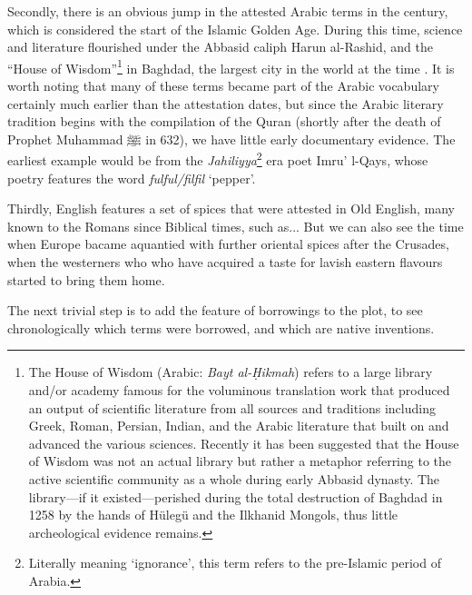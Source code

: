 Secondly, there is an obvious jump in the attested Arabic terms in the  century, which is considered the start of the Islamic Golden Age. During this time, science and literature flourished under the Abbasid caliph Harun al-Rashid, and the ``House of Wisdom''\footnote{The House of Wisdom (Arabic: \textit{Bayt al-Ḥikmah}) refers to a large library and/or academy famous for the voluminous translation work that produced an output of scientific literature from all sources and traditions including Greek, Roman, Persian, Indian, and the Arabic literature that built on and advanced the various sciences. Recently it has been suggested that the House of Wisdom was not an actual library but rather a metaphor referring to the active scientific community as a whole during early Abbasid dynasty. The library---if it existed---perished during the total destruction of Baghdad in 1258 by the hands of Hülegü and the Ilkhanid Mongols, thus little archeological evidence remains.} in Baghdad, the largest city in the world at the time \autocite{gutas_greek_1998}. It is worth noting that many of these terms became part of the Arabic vocabulary certainly much earlier than the attestation dates, but since the Arabic literary tradition begins with the compilation of the Quran (shortly after the death of Prophet Muhammad {ﷺ} in 632), we have little early documentary evidence. The earliest example would be from the \textit{Jahiliyya}\footnote{Literally meaning `ignorance', this term refers to the pre-Islamic period of Arabia.} era poet Imru' l-Qays, whose poetry features the word \textit{fulful/filfil} `pepper'.

Thirdly, English features a set of spices that were attested in Old English, many known to the Romans since Biblical times, such as...
But we can also see the time when Europe bacame aquantied with further oriental spices after the Crusades, when the westerners who who have acquired a taste for lavish eastern flavours started to bring them home.

The next trivial step is to add the feature of borrowings to the plot, to see chronologically which terms were borrowed, and which are native inventions. 


